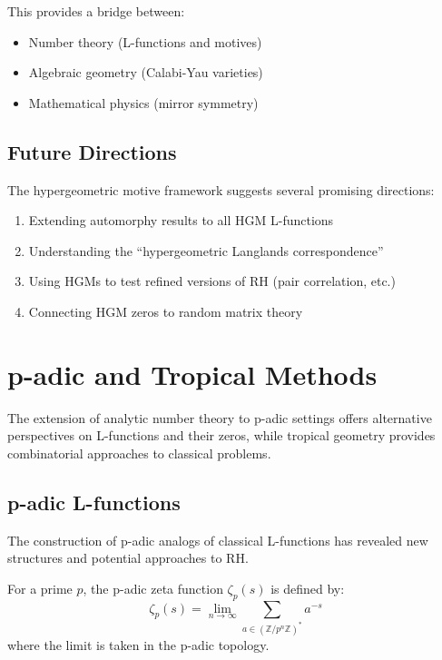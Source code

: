 This provides a bridge between:
\begin{itemize}
\item Number theory (L-functions and motives)
\item Algebraic geometry (Calabi-Yau varieties)
\item Mathematical physics (mirror symmetry)
\end{itemize}

\subsection{Future Directions}

The hypergeometric motive framework suggests several promising directions:
\begin{enumerate}
\item Extending automorphy results to all HGM L-functions
\item Understanding the ``hypergeometric Langlands correspondence''
\item Using HGMs to test refined versions of RH (pair correlation, etc.)
\item Connecting HGM zeros to random matrix theory
\end{enumerate}

\section{p-adic and Tropical Methods}
\label{sec:padic_tropical}

The extension of analytic number theory to p-adic settings offers alternative perspectives on L-functions and their zeros, while tropical geometry provides combinatorial approaches to classical problems.

\subsection{p-adic L-functions}

The construction of p-adic analogs of classical L-functions has revealed new structures and potential approaches to RH.

\begin{definition}
\label{def:padic_zeta}
For a prime $p$, the p-adic zeta function $\zeta_p(s)$ is defined by:
\begin{equation}
\zeta_p(s) = \lim_{n \to \infty} \sum_{a \in (\mathbb{Z}/p^n\mathbb{Z})^*} a^{-s}
\label{eq:padic_zeta}
\end{equation}
where the limit is taken in the p-adic topology.
\end{definition}

